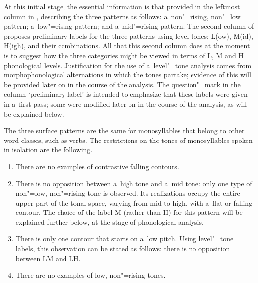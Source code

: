 At this initial stage, the essential
information is that provided in the leftmost column in , describing the three patterns as
follows: a~non"=rising, non"=low pattern; a~low"=rising pattern; and a~mid"=rising pattern.
The second column of  proposes preliminary labels for the three patterns using level tones:
L(ow), M(id), H(igh), and their combinations. All that this second column does at the moment is to suggest how the three categories might be viewed in terms of L, M and H phonological levels. Justification for the use of a~level"=tone analysis
comes from morphophonological alternations in which the tones partake; evidence of this will be provided later on in the course of the analysis. The question"=mark in the column ‘preliminary label’ is
intended to emphasize that these labels were given in a~first pass; some were modified later on in
the course of the analysis, as will be explained below. 

The three surface patterns are the same for monosyllables that belong to other word classes, such as verbs. The restrictions on the tones of monosyllables spoken in isolation are the following. 

\begin{enumerate}[label=(\roman*), itemsep=0pt]
	\item There are
	no examples of contrastive falling contours.
	\item There is no opposition between a~high tone and a~mid tone:
	only one type of non"=low, non"=rising tone is observed. Its realizations occupy the entire upper part
	of the tonal space, varying from mid to high, with a~flat or falling contour. The choice of the
	label M (rather than H) for this pattern will be explained further below, at the stage of
	phonological analysis.
	\item There is only one contour that starts on a~low pitch. Using level"=tone
	labels, this observation can be stated as follows: there is no opposition between LM and LH.
	\item There are no examples of low, non"=rising tones.
\end{enumerate}

